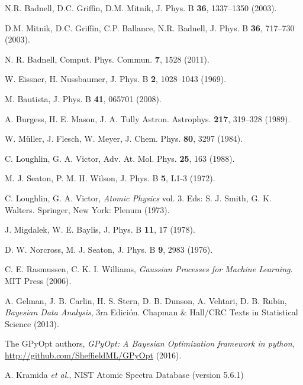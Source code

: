 \begin{thebibliography}{9}
N.R. Badnell, D.C. Griffin, D.M. Mitnik, 
J. Phys. B \textbf{36}, 1337--1350 (2003).

D.M. Mitnik, D.C. Griffin, C.P. Ballance, N.R. Badnell, 
J. Phys. B \textbf{36}, 717--730 (2003).

N. R. Badnell, 
Comput. Phys. Commun. \textbf{7}, 1528 (2011).


W. Eissner, H. Nussbaumer,
J. Phys. B \textbf{2}, 1028--1043 (1969).

M. Bautista,
J. Phys. B \textbf{41}, 065701 (2008).

A. Burgess, H. E. Mason, J. A. Tully
Astron. Astrophys. \textbf{217}, 319--328 (1989).

W. M\"uller, J. Flesch, W. Meyer,
J. Chem. Phys. \textbf{80}, 3297 (1984).

C. Loughlin, G. A. Victor,
Adv. At. Mol. Phys. \textbf{25}, 163 (1988).

M. J. Seaton, P. M. H. Wilson,
J. Phys. B \textbf{5}, L1-3 (1972).

C. Loughlin, G. A. Victor,
\textit{Atomic Physics} vol. 3. 
Eds: S. J. Smith, G. K. Walters.
Springer, New York: Plenum (1973).

J. Migdalek, W. E. Baylis,
J. Phys. B \textbf{11}, 17 (1978).

D. W. Norcross, M. J. Seaton,
J. Phys. B \textbf{9}, 2983 (1976).

C. E. Rasmussen, C. K. I. Williams, 
\textit{Gaussian Processes for Machine Learning}. MIT Press (2006).

A. Gelman, J. B. Carlin, H. S. Stern, D. B. Dunson, A. Vehtari, D. B. Rubin,
\textit{Bayesian Data Analysis}, 3ra Edición. 
Chapman \& Hall/CRC Texts in Statistical Science (2013).

The GPyOpt authors,
\textit{GPyOpt: A Bayesian Optimization framework in python},
\url{http://github.com/SheffieldML/GPyOpt} (2016).

A. Kramida \textit{et al.},
NIST Atomic Spectra Database (version 5.6.1) 


\end{thebibliography}
